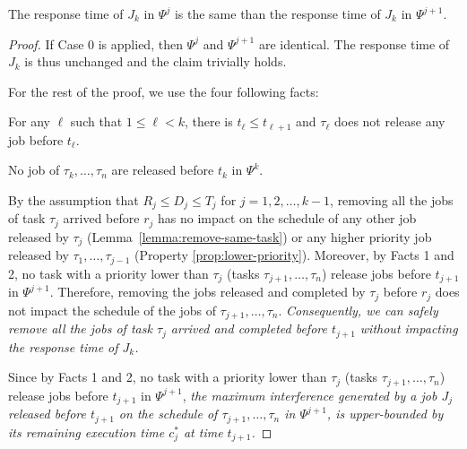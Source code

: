 \begin{Lemma}
\label{lemma:psij}
The response time of $J_k$ in $\Psi^j$ is the same than the response time of $J_k$ in $\Psi^{j+1}$.
\end{Lemma}
\begin{proof}
If Case 0 is applied, then $\Psi^j$ and $\Psi^{j+1}$ are identical. The response time of $J_k$ is thus unchanged and the claim trivially holds.

For the rest of the proof, we use the four following facts:

 For any $\ell$ such that $1 \leq \ell < k$, there is $t_\ell \leq t_{\ell+1}$ and $\tau_\ell$ does not release any job before $t_\ell$.

 No job of $\tau_k, \ldots, \tau_n$ are released before $t_k$ in $\Psi^k$.

 By the assumption that $R_j \leq D_j \leq T_j$ for $j=1,2,\ldots,k-1$, removing all the jobs of task $\tau_j$ arrived before $r_j$ has no impact on the schedule of any other job released by $\tau_j$ (Lemma~\ref{lemma:remove-same-task}) or any higher priority job released by $\tau_1, \ldots, \tau_{j-1}$ (Property \ref{prop:lower-priority}). Moreover, by Facts 1 and 2, no task with a priority lower than $\tau_j$ (tasks $\tau_{j+1}, \ldots, \tau_n$) release jobs before $t_{j+1}$ in $\Psi^{j+1}$. Therefore, removing the jobs released and completed by $\tau_j$ before $r_j$ does not impact the schedule of the jobs of $\tau_{j+1}, \ldots, \tau_{n}$. \emph{Consequently, we can safely remove all the jobs of task $\tau_j$ arrived and completed before $t_{j+1}$ without impacting the response time of $J_{k}$.}

 Since by Facts 1 and 2, no task with a priority lower than $\tau_j$ (tasks $\tau_{j+1}, \ldots, \tau_n$) release jobs before $t_{j+1}$ in $\Psi^{j+1}$, \emph{the maximum interference generated by a job $J_j$ released before $t_{j+1}$ on the schedule of $\tau_{j+1}, \ldots, \tau_n$ in $\Psi^{j+1}$, is upper-bounded by its remaining execution time $c_j^*$ at time $t_{j+1}$.}



\end{proof}
